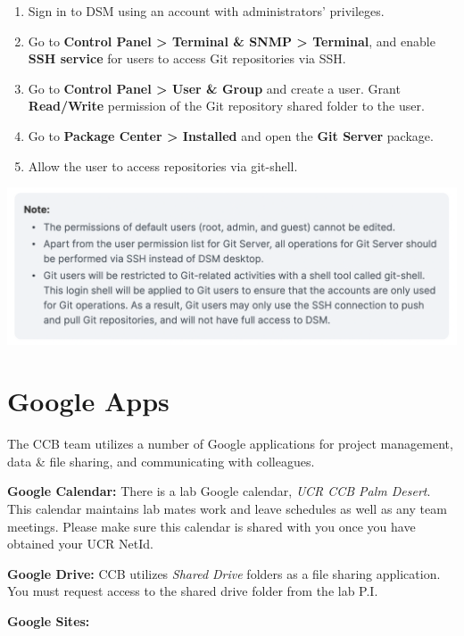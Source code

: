 \documentclass[
]{book}
\providecommand{\tightlist}{%
  \setlength{\itemsep}{0pt}\setlength{\parskip}{0pt}}
\begin{document}
\begin{enumerate}
\def\labelenumi{\arabic{enumi}.}
\tightlist
\item
  Sign in to DSM using an account with administrators' privileges.
\item
  Go to \textbf{Control Panel \textgreater{} Terminal \& SNMP \textgreater{} Terminal}, and enable \textbf{SSH service} for users to access Git repositories via SSH.
\item
  Go to \textbf{Control Panel \textgreater{} User \& Group} and create a user. Grant \textbf{Read/Write} permission of the Git repository shared folder to the user.
\item
  Go to \textbf{Package Center \textgreater{} Installed} and open the \textbf{Git Server} package.
\item
  Allow the user to access repositories via git-shell.
\end{enumerate}

\begin{flushleft}\includegraphics[width=0.85\linewidth]{images/git_usernote} \end{flushleft}

\hypertarget{google-apps}{%
\section{Google Apps}\label{google-apps}}

The CCB team utilizes a number of Google applications for project management, data \& file sharing, and communicating with colleagues.

\textbf{Google Calendar:} There is a lab Google calendar, \emph{UCR CCB Palm Desert}. This calendar maintains lab mates work and leave schedules as well as any team meetings. Please make sure this calendar is shared with you once you have obtained your UCR NetId.

\textbf{Google Drive:} CCB utilizes \emph{Shared Drive} folders as a file sharing application. You must request access to the shared drive folder from the lab P.I.

\textbf{Google Sites:}
\end{document}
